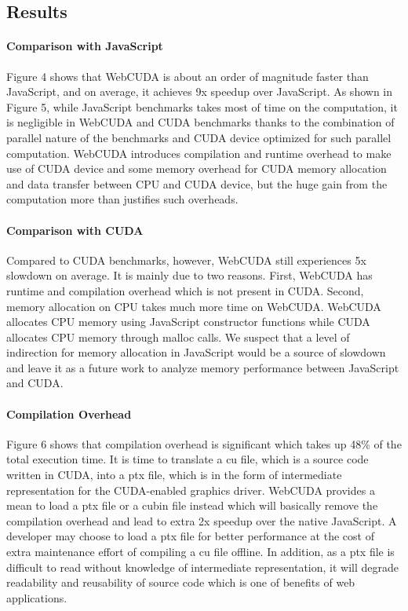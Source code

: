 \subsection{Results}

\paragraph{Comparison with JavaScript}
Figure 4 shows that WebCUDA is about an order of magnitude faster than JavaScript, and on average, it achieves 9x speedup over JavaScript. As shown in Figure 5, while JavaScript benchmarks takes most of time on the computation, it is negligible in WebCUDA and CUDA benchmarks thanks to the combination of parallel nature of the benchmarks and CUDA device optimized for such parallel computation. WebCUDA introduces compilation and runtime overhead to make use of CUDA device and some memory overhead
for CUDA memory allocation and data transfer between CPU and CUDA device, but the huge gain from the computation more than justifies such overheads.

\paragraph{Comparison with CUDA}
Compared to CUDA benchmarks, however, WebCUDA still experiences 5x slowdown on average. It is mainly due to two reasons. First, WebCUDA has runtime and compilation overhead which is not present in CUDA. Second, memory allocation on CPU takes much more time on WebCUDA. WebCUDA allocates CPU memory using JavaScript constructor functions while CUDA allocates CPU memory through malloc calls. We suspect that a level of indirection for memory allocation in JavaScript would be a source of
slowdown and leave it as a future work to analyze memory performance between JavaScript and CUDA.

\paragraph{Compilation Overhead}
Figure 6 shows that compilation overhead is significant which takes up 48\% of the total execution time. It is time to translate a cu file, which is a source code written in CUDA, into a ptx file, which is in the form of intermediate representation for the CUDA-enabled graphics driver. WebCUDA provides a mean to load a ptx file or a cubin file instead which will basically remove the compilation overhead and lead to extra 2x speedup over the native JavaScript. A developer may choose to
load a ptx file for better performance at the cost of extra maintenance effort of compiling a cu file offline. In addition, as a ptx file is difficult to read without knowledge of intermediate representation, it will degrade readability and reusability of source code which is one of benefits of web applications.

